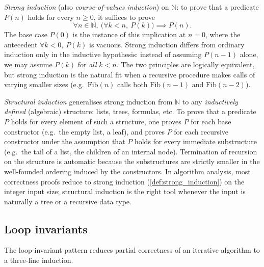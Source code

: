 \begin{definition}
\label{def:strong_induction}
\emph{Strong induction} (also \emph{course-of-values induction}) on $\mathbb{N}$: to prove that a predicate $P(n)$ holds for every $n \ge 0$, it suffices to prove
\[
  \forall n \in \mathbb{N},\ \bigl(\forall k < n,\ P(k)\bigr) \implies P(n).
\]
The base case $P(0)$ is the instance of this implication at $n = 0$, where the antecedent $\forall k < 0,\ P(k)$ is vacuous. Strong induction differs from ordinary induction only in the inductive hypothesis: instead of assuming $P(n-1)$ alone, we may assume $P(k)$ for \emph{all} $k < n$. The two principles are logically equivalent, but strong induction is the natural fit when a recursive procedure makes calls of varying smaller sizes (e.g.\ $\mathrm{Fib}(n)$ calls both $\mathrm{Fib}(n-1)$ and $\mathrm{Fib}(n-2)$).
\end{definition}

\begin{definition}
\label{def:structural_induction}
\emph{Structural induction} generalises strong induction from $\mathbb{N}$ to any \emph{inductively defined} (algebraic) structure: lists, trees, formulas, etc. To prove that a predicate $P$ holds for every element of such a structure, one proves $P$ for each base constructor (e.g.\ the empty list, a leaf), and proves $P$ for each recursive constructor under the assumption that $P$ holds for every immediate substructure (e.g.\ the tail of a list, the children of an internal node). Termination of recursion on the structure is automatic because the substructures are strictly smaller in the well-founded ordering induced by the constructors. In algorithm analysis, most correctness proofs reduce to strong induction (\cref{def:strong_induction}) on the integer input size; structural induction is the right tool whenever the input is naturally a tree or a recursive data type.
\end{definition}

\subsection{Loop invariants}

The loop-invariant pattern reduces partial correctness of an iterative algorithm to a three-line induction.

